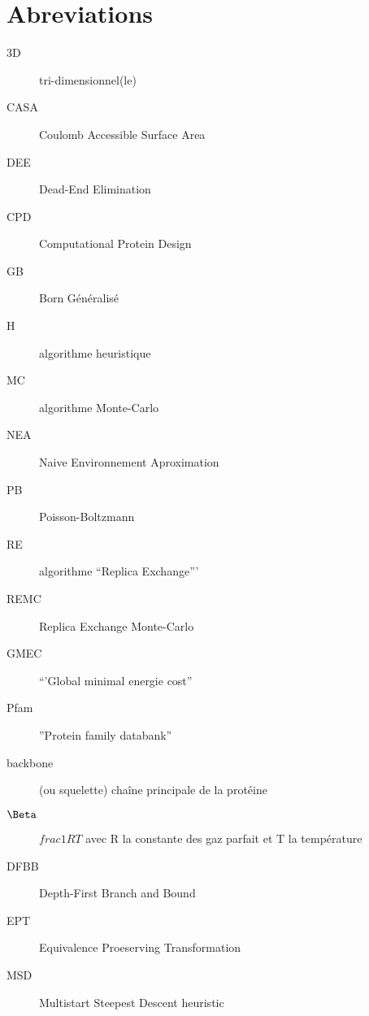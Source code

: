 \chapter*{Abreviations}

\begin{multicols}{2}

\begin{description}
\item[3D] tri-dimensionnel(le)
\item [CASA] Coulomb Accessible Surface Area
\item [DEE] Dead-End Elimination 
\item[CPD] Computational Protein Design
\item [GB] Born Généralisé
\item[H] algorithme heuristique
\item[MC] algorithme Monte-Carlo
\item[NEA] Naive Environnement Aproximation
\item [PB] Poisson-Boltzmann
\item[RE] algorithme ``Replica Exchange'''
\item [REMC] Replica Exchange Monte-Carlo
\item[GMEC] ``'Global minimal energie cost''
\item[Pfam] ''Protein family databank''
\item[backbone]  (ou squelette) chaîne principale de la protéine
\item [$\Beta$]  $frac{1}{RT}$ avec R la constante des gaz parfait et T la température
\item [DFBB] Depth-First Branch and Bound
\item [EPT] Equivalence Proeserving Transformation
\item [MSD] Multistart Steepest Descent heuristic  
\end{description}

\end{multicols}

